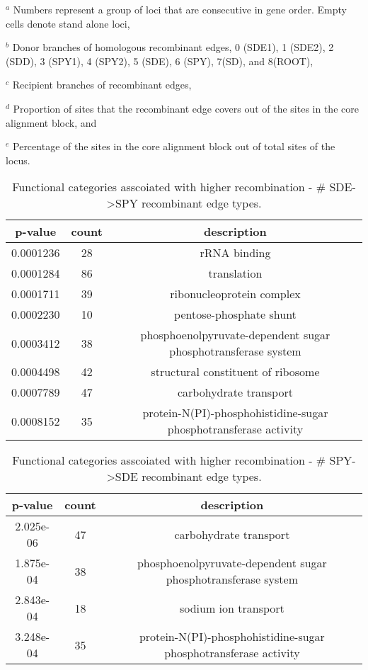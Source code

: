 \documentclass[english]{article}
\providecommand{\tabularnewline}{\\}
\begin{document}
\begin{table}
{$^a$ Numbers represent a group of loci that are consecutive in gene order. Empty
cells denote stand alone loci,

$^b$ Donor branches of homologous recombinant edges, 0 (SDE1), 1 (SDE2), 2
(SDD), 3 (SPY1), 4 (SPY2), 5 (SDE), 6 (SPY), 7(SD), and 8(ROOT),

$^c$ Recipient branches of recombinant edges,

$^d$ Proportion of sites that the recombinant edge covers out of the sites in
the core alignment block, and

$^e$ Percentage of the sites in the core alignment block out of total sites of
the locus.
}

\end{table}
\clearpage{}

%
\begin{table}
\caption{\label{tab:functional-sde-spy}Functional categories asscoiated with higher
recombination - \# SDE->SPY recombinant edge types.}
\begin{tabular}{ccc}
\hline 
p-value & count & description\tabularnewline
\hline 
0.0001236 & 28 & rRNA binding\tabularnewline
0.0001284 & 86 & translation\tabularnewline
0.0001711 & 39 & ribonucleoprotein complex\tabularnewline
0.0002230 & 10 & pentose-phosphate shunt\tabularnewline
0.0003412 & 38 & phosphoenolpyruvate-dependent sugar phosphotransferase system\tabularnewline
0.0004498 & 42 & structural constituent of ribosome\tabularnewline
0.0007789 & 47 & carbohydrate transport\tabularnewline
0.0008152 & 35 & protein-N(PI)-phosphohistidine-sugar phosphotransferase activity\tabularnewline
\hline 
\end{tabular}
\end{table}
\clearpage{}

%
\begin{table}
\caption{\label{tab:functional-spy-sde}Functional categories asscoiated with higher
recombination - \# SPY->SDE recombinant edge types.}
\begin{tabular}{ccc}
\hline 
p-value & count & description\tabularnewline
\hline 
2.025e-06 & 47 & carbohydrate transport\tabularnewline
1.875e-04 & 38 & phosphoenolpyruvate-dependent sugar phosphotransferase system\tabularnewline
2.843e-04 & 18 & sodium ion transport\tabularnewline
3.248e-04 & 35 & protein-N(PI)-phosphohistidine-sugar phosphotransferase activity\tabularnewline
\hline 
\end{tabular}
\end{table}
\clearpage{}
\end{document}
